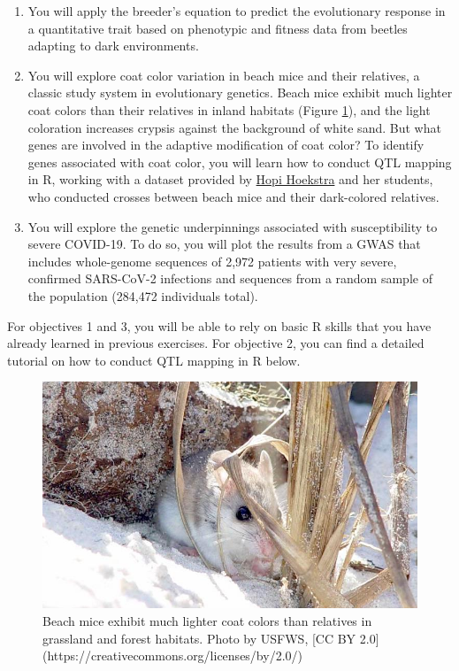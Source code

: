 \documentclass[
]{book}
\begin{document}
\begin{enumerate}
\def\labelenumi{\arabic{enumi}.}
\item
  You will apply the breeder's equation to predict the evolutionary response in a quantitative trait based on phenotypic and fitness data from beetles adapting to dark environments.
\item
  You will explore coat color variation in beach mice and their relatives, a classic study system in evolutionary genetics. Beach mice exhibit much lighter coat colors than their relatives in inland habitats (Figure \ref{fig:beachmouse}), and the light coloration increases crypsis against the background of white sand. But what genes are involved in the adaptive modification of coat color? To identify genes associated with coat color, you will learn how to conduct QTL mapping in R, working with a dataset provided by \href{https://hoekstra.oeb.harvard.edu/}{Hopi Hoekstra} and her students, who conducted crosses between beach mice and their dark-colored relatives.
\item
  You will explore the genetic underpinnings associated with susceptibility to severe COVID-19. To do so, you will plot the results from a GWAS that includes whole-genome sequences of 2,972 patients with very severe, confirmed SARS-CoV-2 infections and sequences from a random sample of the population (284,472 individuals total).
\end{enumerate}

For objectives 1 and 3, you will be able to rely on basic R skills that you have already learned in previous exercises. For objective 2, you can find a detailed tutorial on how to conduct QTL mapping in R below.

\begin{figure}
\includegraphics[width=1\linewidth]{images/beachmouse} \caption{Beach mice exhibit much lighter coat colors than relatives in grassland and forest habitats. Photo by USFWS, [CC BY 2.0](https://creativecommons.org/licenses/by/2.0/)}\label{fig:beachmouse}
\end{figure}
\end{document}

